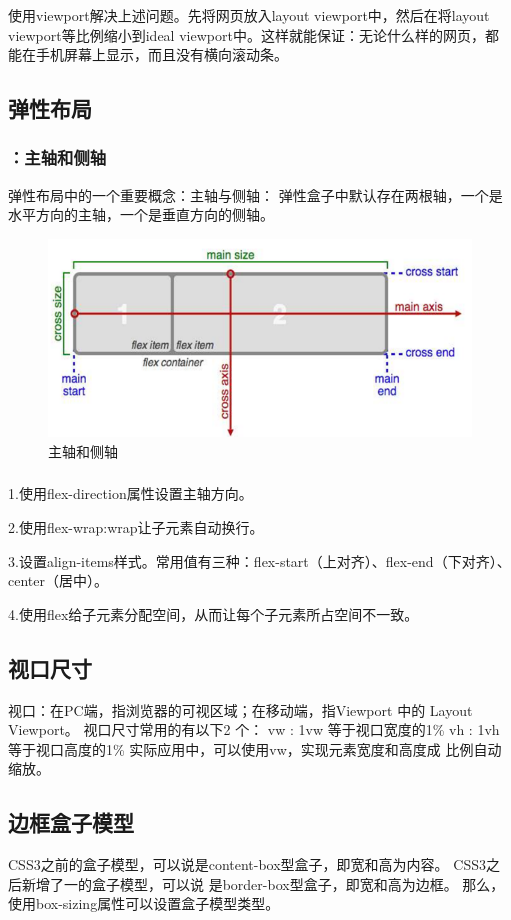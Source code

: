 \subsubsection*{}
使用viewport解决上述问题。先将网页放入layout viewport中，然后在将layout viewport等比例缩小到ideal viewport中。这样就能保证：无论什么样的网页，都能在手机屏幕上显示，而且没有横向滚动条。

\subsection{弹性布局}
\subsubsection*{：主轴和侧轴}
弹性布局中的一个重要概念：主轴与侧轴： 弹性盒子中默认存在两根轴，一个是水平方向的主轴，一个是垂直方向的侧轴。
\begin{figure}[H]
    \centering
    \includegraphics[scale=0.7]{figures/2.2.9.png}
    \caption{主轴和侧轴}
\end{figure}

\subsubsection*{}
1.使用flex-direction属性设置主轴方向。

2.使用flex-wrap:wrap让子元素自动换行。

3.设置align-items样式。常用值有三种：flex-start（上对齐）、flex-end（下对齐）、center（居中）。

4.使用flex给子元素分配空间，从而让每个子元素所占空间不一致。

\subsection{视口尺寸}
视口：在PC端，指浏览器的可视区域；在移动端，指Viewport 中的 Layout Viewport。 视口尺寸常用的有以下2
个： vw : 1vw 等于视口宽度的1\% vh : 1vh 等于视口高度的1\% 实际应用中，可以使用vw，实现元素宽度和高度成
比例自动缩放。

\subsection{边框盒子模型}
CSS3之前的盒子模型，可以说是content-box型盒子，即宽和高为内容。 CSS3之后新增了一的盒子模型，可以说
是border-box型盒子，即宽和高为边框。 那么，使用box-sizing属性可以设置盒子模型类型。